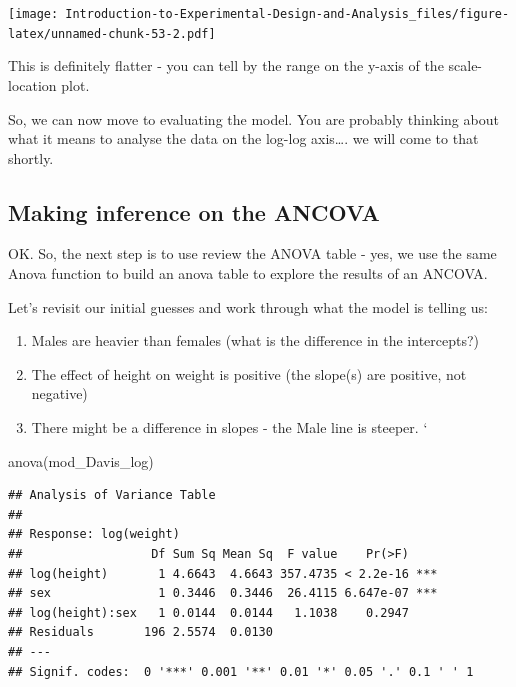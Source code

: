 \documentclass[
]{book}
\newenvironment{Shaded}{\begin{snugshade}}{\end{snugshade}}
\newcommand{\FunctionTok}[1]{\textcolor[rgb]{0.00,0.00,0.00}{#1}}
\newcommand{\NormalTok}[1]{#1}
\providecommand{\tightlist}{%
  \setlength{\itemsep}{0pt}\setlength{\parskip}{0pt}}
\begin{document}
\texttt{[image: Introduction-to-Experimental-Design-and-Analysis\_files/figure-latex/unnamed-chunk-53-2.pdf]}

This is definitely flatter - you can tell by the range on the y-axis of the scale-location plot.

So, we can now move to evaluating the model. You are probably thinking about what it means to analyse the data on the log-log axis\ldots. we will come to that shortly.

\hypertarget{making-inference-on-the-ancova}{%
\subsection{Making inference on the ANCOVA}\label{making-inference-on-the-ancova}}

OK. So, the next step is to use review the ANOVA table - yes, we use the same Anova function to build an anova table to explore the results of an ANCOVA.

Let's revisit our initial guesses and work through what the model is telling us:

\begin{enumerate}
\def\labelenumi{\arabic{enumi}.}
\tightlist
\item
  Males are heavier than females (what is the difference in the intercepts?)
\item
  The effect of height on weight is positive (the slope(s) are positive, not negative)
\item
  There might be a difference in slopes - the Male line is steeper.
  `
\end{enumerate}

\begin{Shaded}
\begin{Highlighting}[]
\FunctionTok{anova}\NormalTok{(mod\_Davis\_log)}
\end{Highlighting}
\end{Shaded}

\begin{verbatim}
## Analysis of Variance Table
## 
## Response: log(weight)
##                  Df Sum Sq Mean Sq  F value    Pr(>F)    
## log(height)       1 4.6643  4.6643 357.4735 < 2.2e-16 ***
## sex               1 0.3446  0.3446  26.4115 6.647e-07 ***
## log(height):sex   1 0.0144  0.0144   1.1038    0.2947    
## Residuals       196 2.5574  0.0130                       
## ---
## Signif. codes:  0 '***' 0.001 '**' 0.01 '*' 0.05 '.' 0.1 ' ' 1
\end{verbatim}
\end{document}
